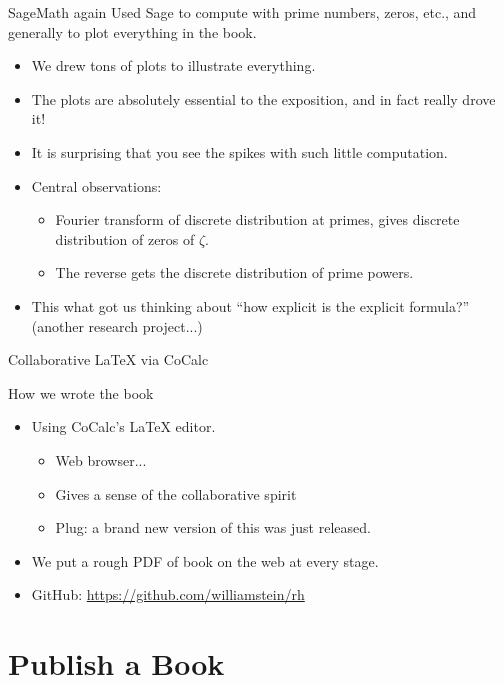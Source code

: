 \documentclass{beamer}
\begin{document}
\begin{frame}{SageMath again}
  Used Sage to compute with prime numbers, zeros, etc., and generally to plot everything in the book.
  \begin{itemize}
    \item We drew tons of plots to illustrate everything.
    \item The plots are absolutely essential to the exposition, and in fact really drove it!
    \item It is surprising that you see the spikes with such little computation.
    \item Central observations:
          \begin{itemize}
            \item Fourier transform of discrete distribution at primes, gives discrete distribution of zeros of $\zeta$.
            \item The reverse gets the discrete distribution of prime powers.
          \end{itemize}
    \item This what got us thinking about ``how explicit is the explicit formula?'' (another research project...)
  \end{itemize}
\end{frame}


\begin{frame}{Collaborative \LaTeX{} via CoCalc}
  \begin{block}{How we wrote the book}
    \begin{itemize}
      \item Using CoCalc's \LaTeX{} editor.
            \begin{itemize}
              \item Web browser...
              \item Gives a sense of the collaborative spirit
              \item Plug: a brand new version of this was just released.
            \end{itemize}
      \item We put a rough PDF of book on the web at every stage.
      \item GitHub: \url{https://github.com/williamstein/rh}
    \end{itemize}
  \end{block}
\end{frame}


\section{Publish a Book}
\end{document}
